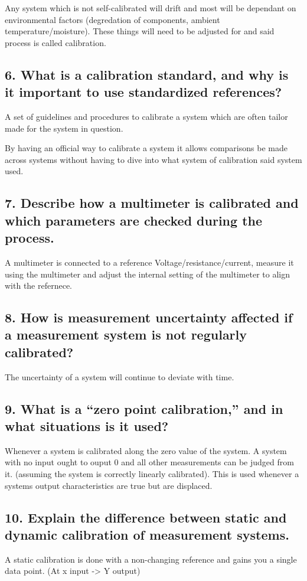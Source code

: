 Any system which is not self-calibrated will drift and most will be dependant on environmental factors (degredation of components, ambient temperature/moisture). These things will need to be adjusted for and said process is called calibration.


\subsection{\textbf{6. What is a calibration standard, and why is it important to use standardized references?}}
A set of guidelines and procedures to calibrate a system which are often tailor made for the system in question. 

By having an official way to calibrate a system it allows comparisons be made across systems without having to dive into what system of calibration said system used.

\subsection{\textbf{7. Describe how a multimeter is calibrated and which parameters are checked during the process.}}
A multimeter is connected to a reference Voltage/resistance/current, measure it using the multimeter and adjust the internal setting of the multimeter to align with the refernece.

\subsection{\textbf{8. How is measurement uncertainty affected if a measurement system is not regularly calibrated?}}
The uncertainty of a system will continue to deviate with time.

\subsection{\textbf{9. What is a “zero point calibration,” and in what situations is it used?}}
Whenever a system is calibrated along the zero value of the system. A system with no input ought to ouput 0 and all other measurements can be judged from it. (assuming the system is correctly linearly calibrated).
This is used whenever a systems output characteristics are true but are displaced.

\subsection{\textbf{10. Explain the difference between static and dynamic calibration of measurement systems.}}
A static calibration is done with a non-changing reference and gains you a single data point. (At x input -> Y output)


